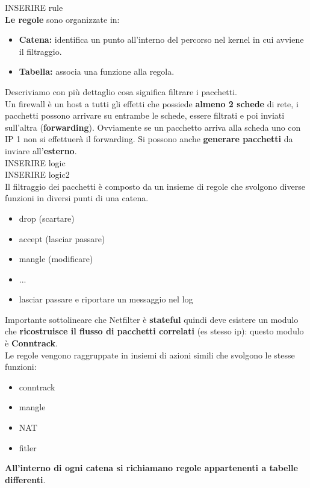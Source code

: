 \documentclass[12pt]{article}
\begin{document}
			INSERIRE rule\\
			
			\textbf{Le regole} sono organizzate in:
			\begin{itemize}
				\item \textbf{Catena:} identifica un punto all'interno del percorso nel kernel in cui avviene il filtraggio.
				\item \textbf{Tabella:} associa una funzione alla regola.
			\end{itemize}
			Descriviamo con più dettaglio cosa significa filtrare i pacchetti.\\
			Un firewall è un host a tutti gli effetti che possiede \textbf{almeno 2 schede} di rete, i pacchetti possono arrivare su entrambe le schede, essere filtrati e poi inviati sull'altra (\textbf{forwarding}). Ovviamente se un pacchetto arriva alla scheda uno con IP 1 non si effettuerà il forwarding. Si possono anche \textbf{generare pacchetti} da inviare all'\textbf{esterno}.\\
			
			INSERIRE logic\\
			
			INSERIRE logic2\\
			
			Il filtraggio dei pacchetti è composto da un insieme di regole che svolgono diverse funzioni in diversi punti di una catena. 
			\begin{itemize}
				\item drop (scartare)
				\item accept (lasciar passare)
				\item mangle (modificare)
				\item ...
				\item lasciar passare e riportare un messaggio nel log
			\end{itemize}
			Importante sottolineare che Netfilter è \textbf{stateful} quindi deve esistere un modulo che \textbf{ricostruisce il flusso di pacchetti correlati} (es stesso ip): questo modulo è \textbf{Conntrack}.\\
			Le regole vengono raggruppate in insiemi di azioni simili che svolgono le stesse funzioni:
			\begin{itemize}
				\item conntrack
				\item mangle
				\item NAT
				\item fitler
			\end{itemize}
			\textbf{All'interno di ogni catena si richiamano regole appartenenti a tabelle differenti}.
			
\end{document}
